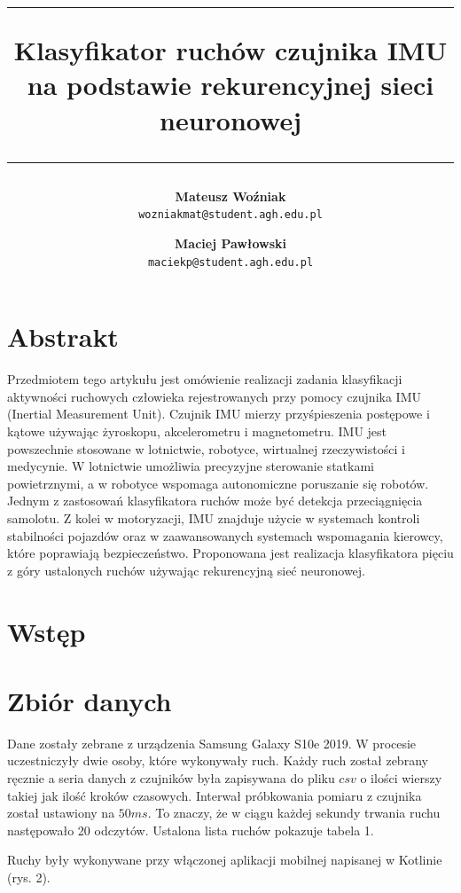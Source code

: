 \documentclass[10pt]{article}
\title{
\rule{\linewidth}{3pt}
Klasyfikator ruchów czujnika IMU na podstawie rekurencyjnej sieci neuronowej
\rule{\linewidth}{1pt}
}
\author{
  \textbf{Mateusz Woźniak}\\
  \texttt{wozniakmat@student.agh.edu.pl}
  \and
  \textbf{Maciej Pawłowski}\\
  \texttt{maciekp@student.agh.edu.pl}
}
\date{}
\begin{document}
\maketitle

\section*{Abstrakt}

Przedmiotem tego artykułu jest omówienie realizacji zadania klasyfikacji aktywności ruchowych człowieka rejestrowanych przy pomocy czujnika IMU (Inertial Measurement Unit). Czujnik IMU mierzy przyśpieszenia postępowe i kątowe używając żyroskopu, akcelerometru i magnetometru. 
IMU jest powszechnie stosowane w lotnictwie, robotyce, wirtualnej rzeczywistości i medycynie. W lotnictwie umożliwia precyzyjne sterowanie statkami powietrznymi, a w robotyce wspomaga autonomiczne poruszanie się robotów. Jednym z zastosowań klasyfikatora ruchów może być detekcja przeciągnięcia samolotu. Z kolei w motoryzacji, IMU znajduje użycie w systemach kontroli stabilności pojazdów oraz w zaawansowanych systemach wspomagania kierowcy, które poprawiają bezpieczeństwo. Proponowana jest realizacja klasyfikatora pięciu z góry ustalonych ruchów używając rekurencyjną sieć neuronowej. 

\section{Wstęp}

\section{Zbiór danych}
Dane zostały zebrane z urządzenia Samsung Galaxy S10e 2019. W procesie uczestniczyły dwie osoby, które wykonywały ruch. Każdy ruch został zebrany ręcznie a seria danych z czujników była zapisywana do pliku $csv$ o ilości wierszy takiej jak ilość kroków czasowych. Interwał próbkowania pomiaru z czujnika został ustawiony na $50ms$. To znaczy, że w ciągu każdej sekundy trwania ruchu następowało 20 odczytów. Ustalona lista ruchów pokazuje tabela 1. 

Ruchy były wykonywane przy włączonej aplikacji mobilnej napisanej w Kotlinie (rys. 2).
\end{document}
